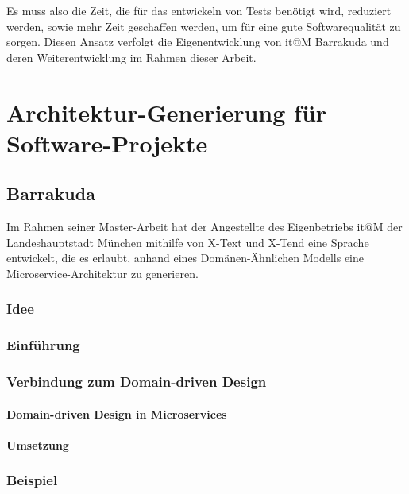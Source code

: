 \documentclass[12pt,a4paper,bibliography=totocnumbered,listof=totocnumbered]{scrartcl}
\begin{document}
Es muss also die Zeit, die für das entwickeln von Tests benötigt wird, reduziert werden, sowie mehr Zeit geschaffen werden, um für eine gute Softwarequalität zu sorgen. Diesen Ansatz verfolgt die Eigenentwicklung von it@M Barrakuda und deren Weiterentwicklung im Rahmen dieser Arbeit.

\section{Architektur-Generierung für Software-Projekte}

\subsection{Barrakuda}

Im Rahmen seiner Master-Arbeit hat der Angestellte des Eigenbetriebs it@M der Landeshauptstadt München mithilfe von X-Text und X-Tend eine Sprache entwickelt, die es erlaubt, anhand eines Domänen-Ähnlichen Modells eine Microservice-Architektur zu generieren.

\subsubsection{Idee}

\subsubsection{Einführung}

\subsubsection{Verbindung zum Domain-driven Design}

\paragraph{Domain-driven Design in Microservices}

\paragraph{Umsetzung}

\subsubsection{Beispiel}
\end{document}
